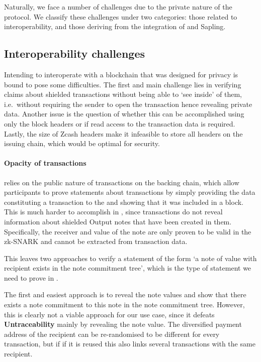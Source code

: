 Naturally, we face a number of challenges due to the private nature of the protocol.
We classify these challenges under two categories: those related to interoperability, and those deriving from the integration of \zclaim and Sapling.

\subsection{Interoperability challenges}

Intending to interoperate with a blockchain that was designed for privacy is bound to pose some difficulties.
The first and main challenge lies in verifying claims about shielded transactions without being able to `see inside' of them, i.e.\ without requiring the sender to open the transaction hence revealing private data.
Another issue is the question of whether this can be accomplished using only the block headers or if read access to the transaction data is required.
Lastly, the size of Zcash headers make it infeasible to store all headers on the issuing chain, which would be optimal for security.


\paragraph{Opacity of transactions}
\xclaim relies on the public nature of transactions on the backing chain, which allow participants to prove statements about transactions by simply providing the data constituting a transaction to the \isc and showing that it was included in a block.
This is much harder to accomplish in \zclaim, since transactions do not reveal information about shielded Output notes that have been created in them.
Specifically, the receiver and value of the note are only proven to be valid in the zk-SNARK and cannot be extracted from transaction data.

This leaves two approaches to verify a statement of the form `a note \n of value \val with recipient \dpa exists in the note commitment tree', which is the type of statement we need to prove in \zclaim.

The first and easiest approach is to reveal the note values and show that there exists a note commitment to this note in the note commitment tree.
However, this is clearly not a viable approach for our use case, since it defeats \textbf{Untraceability} mainly by revealing the note value.
The diversified payment address of the recipient can be re-randomised to be different for every transaction, but if if it is reused this also links several transactions with the same recipient.

